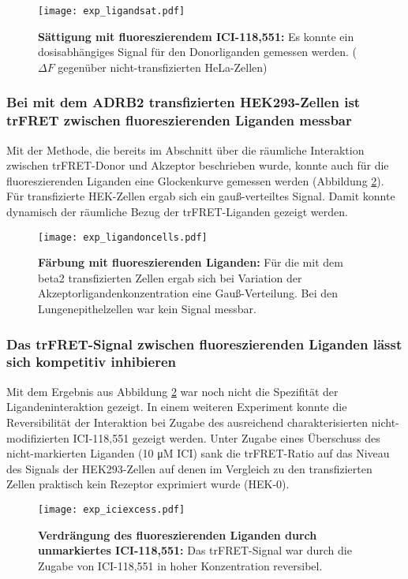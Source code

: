 \begin{figure}[htbp]
	\centering
    \texttt{[image: exp\_ligandsat.pdf]}
    \caption{\textbf{Sättigung mit fluoreszierendem ICI-118,551:} Es konnte ein dosisabhängiges Signal für den Donorliganden gemessen werden. ($\Delta F$ gegenüber nicht-transfizierten HeLa-Zellen)} 
    \label{fig:ligandsat}
\end{figure}

\subsubsection{Bei mit dem ADRB2 transfizierten HEK293-Zellen ist trFRET zwischen fluoreszierenden Liganden messbar}
Mit der Methode, die bereits im Abschnitt über die räumliche Interaktion zwischen trFRET-Donor und Akzeptor beschrieben wurde, konnte auch für die fluoreszierenden Liganden eine Glockenkurve gemessen werden (Abbildung \ref{fig:ligandoncells}). Für transfizierte HEK-Zellen ergab sich ein gauß-verteiltes Signal. Damit konnte dynamisch der räumliche Bezug der trFRET-Liganden gezeigt werden. 

\begin{figure}[htbp]
	\centering
    \texttt{[image: exp\_ligandoncells.pdf]}
    \caption{\textbf{Färbung mit fluoreszierenden Liganden:} Für die mit dem \gls{beta2} transfizierten Zellen ergab sich bei Variation der Akzeptorligandenkonzentration eine Gauß-Verteilung. Bei den Lungenepithelzellen war kein Signal messbar.} 
    \label{fig:ligandoncells}
\end{figure}

\subsubsection{Das trFRET-Signal zwischen fluoreszierenden Liganden lässt sich kompetitiv inhibieren}

Mit dem Ergebnis aus Abbildung \ref{fig:ligandoncells} war noch nicht die Spezifität der Ligandeninteraktion gezeigt. In einem weiteren Experiment konnte die Reversibilität der Interaktion bei Zugabe des ausreichend charakterisierten nicht-modifizierten ICI-118,551 gezeigt werden. Unter Zugabe eines Überschuss des nicht-markierten Liganden (10 \si{\micro M} ICI) sank die trFRET-Ratio auf das Niveau des Signals der HEK293-Zellen auf denen im Vergleich zu den transfizierten Zellen praktisch kein Rezeptor exprimiert wurde (HEK-0).

\begin{figure}[htbp]
	\centering
    \texttt{[image: exp\_iciexcess.pdf]}
    \caption{\textbf{Verdrängung des fluoreszierenden Liganden durch unmarkiertes ICI-118,551:} Das trFRET-Signal war durch die Zugabe von ICI-118,551 in hoher Konzentration reversibel.} 
    \label{fig:iciexcess}
\end{figure}

